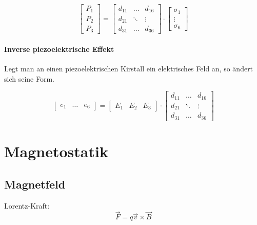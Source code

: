 			\begin{equation*}
				\begin{bmatrix}
					P_1 \\ P_2 \\ P_3
				\end{bmatrix}
				=
				\begin{bmatrix}
					d_{11} & \dots & d_{16} \\
					d_{21} & \ddots & \vdots \\
					d_{31} & \dots & d_{36}
				\end{bmatrix}
				\cdot
				\begin{bmatrix}
					\sigma_1 \\
					\vdots \\
					\sigma_6
				\end{bmatrix}
			\end{equation*}
		
		\paragraph{Inverse piezoelektrische Effekt} %
			Legt man an einen piezoelektrischen Kirstall ein elektrisches Feld an, so ändert sich seine Form.
			
			\begin{equation*}
				\begin{bmatrix}
					e_1 &
					\dots &
					e_6
				\end{bmatrix}
				=
				\begin{bmatrix}
					E_1 & E_2 & E_3
				\end{bmatrix}
				\cdot
				\begin{bmatrix}
					d_{11} & \dots & d_{16} \\
					d_{21} & \ddots & \vdots \\
					d_{31} & \dots & d_{36}
				\end{bmatrix}
			\end{equation*}
		
\section{Magnetostatik} %
	\subsection{Magnetfeld} %
		Lorentz-Kraft:
		\begin{equation*}
			\vec F = q \vec v \times \vec B
		\end{equation*}
